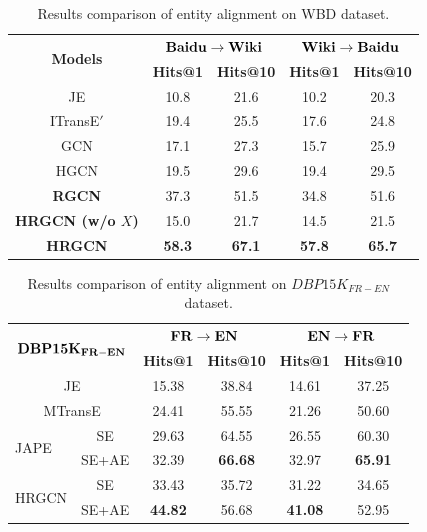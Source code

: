		\begin{table}
		\centering
		\small
		\begin{tabular}{c|cc|cc}
			\toprule
			\multirow{2}{*}{\bf Models} &  \multicolumn{2}{c|}{$\bf Baidu \rightarrow Wiki$} & \multicolumn{2}{c}{$\bf Wiki \rightarrow Baidu$} \\
			& \bf Hits@1 & \bf Hits@10 & \bf Hits@1 & \bf Hits@10 \\
			\midrule
			JE & 10.8 & 21.6 & 10.2 & 20.3 \\
			ITransE$'$ & 19.4 & 25.5 & 17.6 & 24.8 \\
			GCN & 17.1 & 27.3 & 15.7 & 25.9 \\
			HGCN & 19.5 & 29.6 & 19.4 & 29.5  \\
			\bf RGCN & 37.3 & 51.5 & 34.8 & 51.6 \\
			\bf HRGCN (w/o $X$) & 15.0 & 21.7 & 14.5 & 21.5 \\
			\bf HRGCN & \bf 58.3 & \bf 67.1 & \bf 57.8 & \bf 65.7 \\
			\bottomrule
		\end{tabular}
		\caption{Results comparison of entity alignment on WBD dataset.}
		\label{f1}
	\end{table}
	\begin{table}
		\centering
		\small
		\begin{tabular}{lc|cc|cc}
			\toprule
			\multicolumn{2}{c|}{\multirow{2}{*}{$\bf DBP15K_{FR-EN}$}} & \multicolumn{2}{c|}{$\bf FR \rightarrow EN$} & \multicolumn{2}{c}{$\bf EN \rightarrow FR$} \\
			& & \bf Hits@1 & \bf Hits@10 & \bf Hits@1 & \bf Hits@10 \\
			\midrule
			\multicolumn{2}{c|}{JE} & 15.38 & 38.84 & 14.61 & 37.25 \\
			\midrule
			\multicolumn{2}{c|}{MTransE} & 24.41 & 55.55 & 21.26 & 50.60 \\
			\midrule
			\multirow{2}{*}{JAPE} & SE & 29.63 & 64.55 & 26.55 & 60.30 \\
			& SE+AE & 32.39 & \bf 66.68 & 32.97 & \bf 65.91 \\
			\midrule
			\multirow{2}{*}{HRGCN} & SE & 33.43& 35.72& 31.22& 34.65\\
			& SE+AE & \bf 44.82 & 56.68 &\bf 41.08 & 52.95\\
			\bottomrule
		\end{tabular}
		\caption{Results comparison of entity alignment on $DBP15K_{FR-EN}$ dataset.}
		\label{cross}
	\end{table}
	
